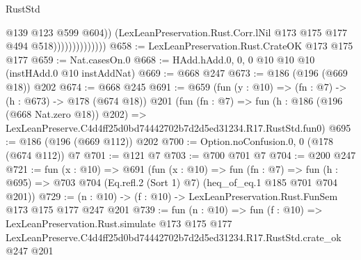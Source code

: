 \begin{lexlean}{RustStd}
\begin{coremodule}
                                  @139
                                  @123
                                  @599
                                  @604))
                              (LexLeanPreservation.Rust.Corr.lNil
                                @173
                                @175
                                @177
                                @494
                                @518))))))))))))))
@658 := LexLeanPreservation.Rust.CrateOK @173 @175 @177
@659 := Nat.casesOn.{0}
@668 := HAdd.hAdd.{0, 0, 0} @10 @10 @10 (instHAdd.{0} @10 instAddNat)
@669 := @668 @247
@673 := @186 (@196 (@669 @18)) @202
@674 := @668 @245
@691 := @659
    (fun (y : @10) => (fn : @7) -> (h : @673) -> @178 (@674 @18))
    @201
    (fun (fn : @7) =>
    fun (h : @186 (@196 (@668 Nat.zero @18)) @202) =>
    LexLeanPreserve.C4d4ff25d0bd74442702b7d2d5ed31234.R17.RustStd.fun0)
@695 := @186 (@196 (@669 @112)) @202
@700 := Option.noConfusion.{0, 0} (@178 (@674 @112)) @7
@701 := @121 @7
@703 := @700 @701 @7
@704 := @200 @247
@721 := fun (x : @10) =>
  @691
    (fun (x : @10) =>
    fun (fn : @7) =>
    fun (h : @695) => @703 @704 (Eq.refl.{2} (Sort 1) @7) (heq_of_eq.{1} @185 @701 @704 @201))
@729 := (n : @10) -> (f : @10) -> LexLeanPreservation.Rust.FunSem @173 @175 @177 @247 @201
@739 := fun (n : @10) =>
  fun (f : @10) =>
  LexLeanPreservation.Rust.simulate
    @173
    @175
    @177
    LexLeanPreserve.C4d4ff25d0bd74442702b7d2d5ed31234.R17.RustStd.crate_ok
    @247
    @201
\end{coremodule}
\end{lexlean}

